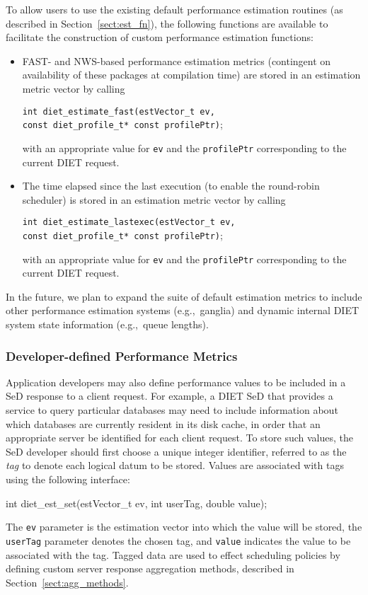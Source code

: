 To allow users to use the existing default performance estimation
routines (as described in Section~\ref{sect:est_fn}), the following
functions are available to facilitate the construction of custom
performance estimation functions:
\begin{itemize}
\item FAST- and NWS-based performance estimation metrics (contingent
  on availability of these packages at compilation time) are stored in
  an estimation metric vector by calling
  \begin{tabbing}
    \texttt{int diet\_estimate\_fast(}\=\texttt{estVector\_t ev,} \\
    \> \texttt{const diet\_profile\_t* const profilePtr)};
  \end{tabbing}
   with an appropriate value for \texttt{ev} and the
   \texttt{profilePtr} corresponding to the current DIET request.
\item The time elapsed since the last execution (to enable
  the round-robin scheduler) is stored in an estimation metric vector
  by calling
  \begin{tabbing}
    \texttt{int diet\_estimate\_lastexec(}\=\texttt{estVector\_t ev,} \\
    \> \texttt{const diet\_profile\_t* const profilePtr)};
  \end{tabbing}
  with an appropriate value for \texttt{ev} and the
  \texttt{profilePtr} corresponding to the current DIET request.

\end{itemize}

In the future, we plan to expand the suite of default estimation
metrics to include other performance estimation systems
(e.g.,~ganglia) and dynamic internal DIET system state information
(e.g.,~queue lengths).

\subsubsection{Developer-defined Performance Metrics}

Application developers may also define performance values to be
included in a SeD response to a client request.  For example, a DIET
SeD that provides a service to query particular databases may need
to include information about which databases are currently resident in
its disk cache, in order that an appropriate server be identified for
each client request.  To store such values, the SeD developer should
first choose a unique integer identifier, referred to as the
\emph{tag} to denote each logical datum to be stored.  Values are
associated with tags using the following interface:
\begin{code}
int diet\_est\_set(estVector\_t ev, int userTag, double value);
\end{code}
The \texttt{ev} parameter is the estimation vector into which the
value will be stored, the \texttt{userTag} parameter denotes the
chosen tag, and \texttt{value} indicates the value to be associated
with the tag.  Tagged data are used to effect
scheduling policies by defining custom server response
aggregation methods, described in Section~\ref{sect:agg_methods}.

